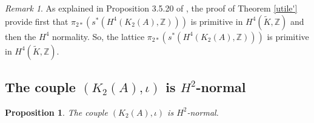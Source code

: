 \documentclass{alggeom}
\newcommand{\Z}{\mathbb{Z}}
\theoremstyle{plain}
\newtheorem{prop}[theorem]{Proposition}
\theoremstyle{definition}
\theoremstyle{remark}
\newtheorem{rmk}[theorem]{Remark}
\begin{document}
\begin{rmk}\label{primitive1}
As explained in Proposition 3.5.20 of \cite{Lol}, the proof of Theorem \ref{utile'} provide first that $\pi_{2*}(s^*(H^4(K_2(A),\Z)))$ is primitive in $H^4(\widetilde{K},\Z)$ and then the $H^4$ normality. 
So, the lattice $\pi_{2*}(s^*(H^4(K_2(A),\Z)))$ is primitive in $H^4(\widetilde{K},\Z)$.
\end{rmk}
\subsection{The couple $(K_{2}(A),\iota)$ is $H^{2}$-normal}\label{H2}
\begin{prop}
The couple $(K_{2}(A),\iota)$ is $H^{2}$-normal.
\end{prop}
\end{document}
